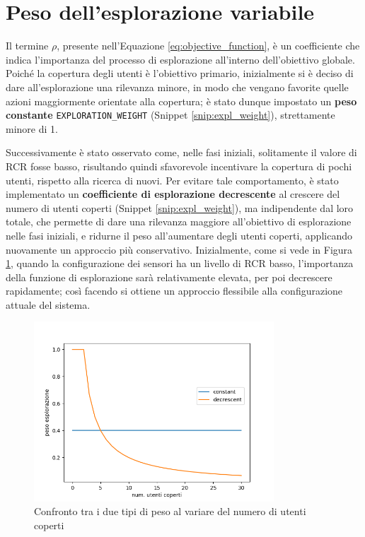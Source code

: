 \pagebreak
\section{Peso dell'esplorazione variabile} \label{sec:peso_esplorazione}
Il termine $\rho$, presente nell'Equazione \ref{eq:objective_function}, è un coefficiente che  indica l'importanza del processo di esplorazione all'interno dell'obiettivo globale.
Poiché la copertura degli utenti è l'obiettivo primario, inizialmente si è deciso di dare all'esplorazione una rilevanza minore, in modo che vengano favorite quelle azioni maggiormente orientate alla copertura; è stato dunque impostato un \textbf{peso constante} \texttt{EXPLORATION\_WEIGHT} (Snippet \ref{snip:expl_weight}), strettamente minore di 1.



Successivamente è stato osservato come, nelle fasi iniziali, solitamente il valore di RCR fosse basso, risultando quindi sfavorevole incentivare la copertura di pochi utenti, rispetto alla ricerca di nuovi.
Per evitare tale comportamento, è stato implementato un \textbf{coefficiente di esplorazione decrescente} al crescere del numero di utenti coperti (Snippet \ref{snip:expl_weight}), ma indipendente dal loro totale, che permette di dare una rilevanza maggiore all'obiettivo di esplorazione nelle fasi iniziali, e ridurne il peso all'aumentare degli utenti coperti, applicando nuovamente un approccio più conservativo.
Inizialmente, come si vede in Figura \ref{fig:expl_weight_comparison}, quando la configurazione dei sensori ha un livello di RCR basso, l'importanza della funzione di esplorazione sarà relativamente elevata, per poi decrescere rapidamente; così facendo si ottiene un approccio flessibile alla configurazione attuale del sistema.

\begin{figure}
    \centering
    \includegraphics[width=0.8\textwidth]{img/ch3/expl_weight_comparison.png}
    \caption{Confronto tra i due tipi di peso al variare del numero di utenti coperti}
    \label{fig:expl_weight_comparison}
\end{figure}